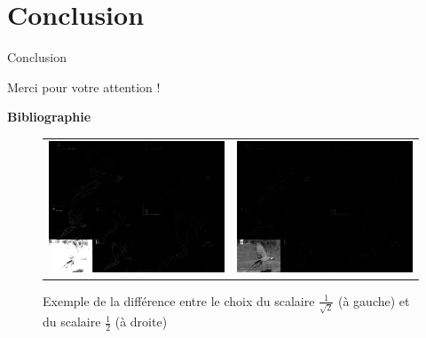 \documentclass[10pt]{beamer}
\begin{document}
  \section{Conclusion}

    \begin{frame}
      \centering
      Conclusion
    \end{frame}
    
    \begin{frame}
      \centering
      Merci pour votre attention !
    \end{frame}
    
    \begin{frame}
      \textbf{\LARGE Bibliographie}
      \nocite{*}
      
      
    \end{frame}
  
  \appendix
  
    \begin{frame}
      \begin{figure}[H]

	\begin{tabular}{cc}
	
	  \includegraphics[width = 0.5 \linewidth]{ara_sqrt2.eps} &
	  \includegraphics[width = 0.5 \linewidth]{ara_wt_V1.eps} \\	
	  
	\end{tabular}
	
	\caption{Exemple de la diff\'{e}rence entre le choix du scalaire $\frac{1}{\sqrt{2}}$ (\`{a} gauche) 
	    et du scalaire $\frac{1}{2}$ (\`{a} droite)}
	
      \end{figure}   
    \end{frame}
    
\end{document}

